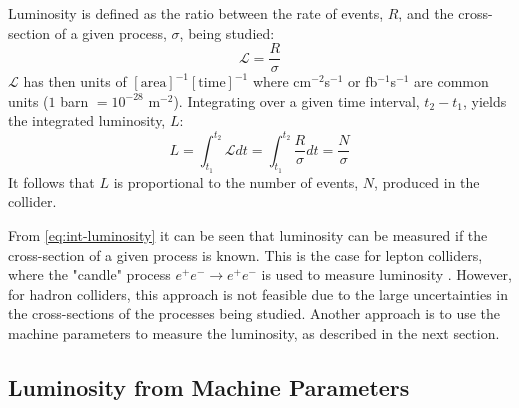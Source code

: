 Luminosity is defined as the ratio between the rate of events, $R$, and the cross-section of a given process, $\sigma$, being studied:
\begin{equation}
    \label{eq:inst-luminosity}
    \mathcal{L} = \frac{R}{\sigma}
\end{equation}
$\mathcal{L}$ has then units of $[\mathrm{area}]^{-1} [\mathrm{time}]^{-1}$ where cm$^{-2}$s$^{-1}$ or fb$^{-1}$s$^{-1}$ are common units ($1$ barn  $= 10^{-28}$ m$^{-2}$). Integrating over a given time interval, $t_2 - t_1$, yields the integrated luminosity, $L$:
\begin{equation}
    \label{eq:int-luminosity}
    L = \int_{t_1}^{t_2} \mathcal{L} dt = \int_{t_1}^{t_2} \frac{R}{\sigma} dt = \frac{N}{\sigma}
\end{equation}
It follows that $L$ is proportional to the number of events, $N$, produced in the collider.

From \autoref{eq:int-luminosity} it can be seen that luminosity can be measured if the cross-section of a given process is known. This is the case for lepton colliders, where the "candle" process $e^+ e^- \rightarrow e^+ e^-$ is used to measure luminosity \cite{Burkhardt:1056691}. However, for hadron colliders, this approach is not feasible due to the large uncertainties in the cross-sections of the processes being studied. Another approach is to use the machine parameters to measure the luminosity, as described in the next section.

\subsection{Luminosity from Machine Parameters}

